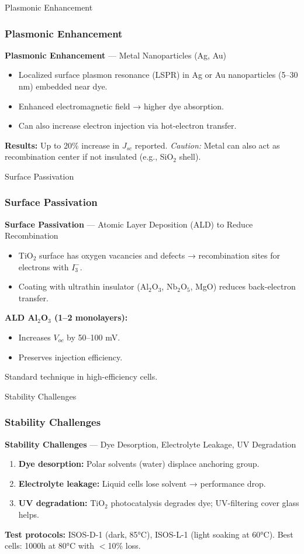 \documentclass[aspectratio=169]{beamer}
\begin{document}
\begin{frame}{Plasmonic Enhancement}
\frametitle{Plasmonic Enhancement}

\textbf{Plasmonic Enhancement} — Metal Nanoparticles (Ag, Au)
\begin{itemize}
\item Localized surface plasmon resonance (LSPR) in Ag or Au nanoparticles (5–30 nm) embedded near dye.
\item Enhanced electromagnetic field → higher dye absorption.
\item Can also increase electron injection via hot-electron transfer.
\end{itemize}
\textbf{Results:} Up to 20\% increase in $J_{sc}$ reported.
\vspace{2mm}
\textit{Caution:} Metal can also act as recombination center if not insulated (e.g., SiO$_2$ shell).
\cite{Standridge2009}
\end{frame}


\begin{frame}{Surface Passivation}
\frametitle{Surface Passivation}

\textbf{Surface Passivation} — Atomic Layer Deposition (ALD) to Reduce Recombination
\begin{itemize}
\item TiO$_2$ surface has oxygen vacancies and defects → recombination sites for electrons with $I_3^-$.
\item Coating with ultrathin insulator (Al$_2$O$_3$, Nb$_2$O$_5$, MgO) reduces back-electron transfer.
\end{itemize}
\textbf{ALD Al$_2$O$_3$ (1–2 monolayers):}
\begin{itemize}
\item Increases $V_{oc}$ by 50–100 mV.
\item Preserves injection efficiency.
\end{itemize}
Standard technique in high-efficiency cells.
\cite{Palomares2004}
\end{frame}


\begin{frame}{Stability Challenges}
\frametitle{Stability Challenges}

\textbf{Stability Challenges} — Dye Desorption, Electrolyte Leakage, UV Degradation
\begin{enumerate}
\item \textbf{Dye desorption:} Polar solvents (water) displace anchoring group.
\item \textbf{Electrolyte leakage:} Liquid cells lose solvent → performance drop.
\item \textbf{UV degradation:} TiO$_2$ photocatalysis degrades dye; UV-filtering cover glass helps.
\end{enumerate}
\textbf{Test protocols:} ISOS-D-1 (dark, 85°C), ISOS-L-1 (light soaking at 60°C).
\vspace{2mm}
Best cells: 1000h at 80°C with $<$10\% loss.
\cite{Kato2009}
\end{frame}
\end{document}
